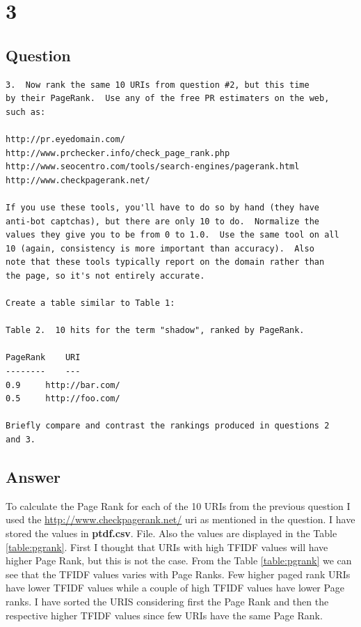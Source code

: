 \documentclass[letterpaper,11pt]{article}
\begin{document}
\clearpage


\section*{3}

\subsection*{Question}

\begin{verbatim}
3.  Now rank the same 10 URIs from question #2, but this time 
by their PageRank.  Use any of the free PR estimaters on the web,
such as:

http://pr.eyedomain.com/
http://www.prchecker.info/check_page_rank.php
http://www.seocentro.com/tools/search-engines/pagerank.html
http://www.checkpagerank.net/

If you use these tools, you'll have to do so by hand (they have
anti-bot captchas), but there are only 10 to do.  Normalize the
values they give you to be from 0 to 1.0.  Use the same tool on all
10 (again, consistency is more important than accuracy).  Also
note that these tools typically report on the domain rather than
the page, so it's not entirely accurate.  

Create a table similar to Table 1:

Table 2.  10 hits for the term "shadow", ranked by PageRank.

PageRank	URI
--------	---
0.9		http://bar.com/
0.5		http://foo.com/

Briefly compare and contrast the rankings produced in questions 2
and 3.
\end{verbatim}

\clearpage
\subsection*{Answer}

To calculate the Page Rank for each of the 10 URIs from the previous question I used the \url{http://www.checkpagerank.net/} uri as mentioned in the question. I have stored the values in \textbf{ptdf.csv}. 
 File. Also the values are displayed in the Table \ref{table:pgrank}. First I thought that URIs with high TFIDF values will have higher Page Rank, but this is not the case. From the Table \ref{table:pgrank} we can see that the TFIDF values varies with Page Ranks. Few higher paged rank URIs have lower TFIDF values while a couple of high TFIDF values have lower Page ranks. I have sorted the URIS considering first the Page Rank and then the respective higher TFIDF values since few URIs have the same Page Rank.
\end{document}
